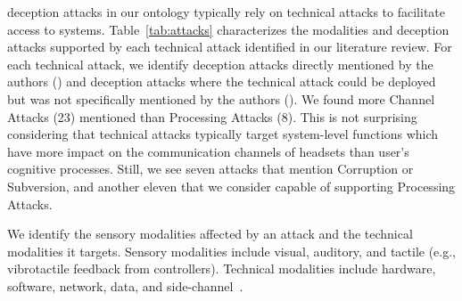 \MR deception attacks in our ontology typically rely on technical attacks to facilitate access to \MR systems.
Table~\ref{tab:attacks} characterizes the modalities and deception attacks supported by each technical attack identified in our literature review.
For each technical attack, we identify deception attacks directly mentioned by the authors () and deception attacks where the technical attack could be deployed but was not specifically mentioned by the authors ().
We found more Channel Attacks (23) mentioned than Processing Attacks (8). 
This is not surprising considering that technical attacks typically target system-level functions which have more impact on the communication channels of \MR headsets than user's cognitive processes.
Still, we see seven attacks that mention Corruption or Subversion, and another eleven that we consider capable of supporting Processing Attacks.



We identify the sensory modalities affected by an attack and the technical modalities it targets. 
Sensory modalities include visual, auditory, and tactile (e.g., vibrotactile feedback from controllers).
Technical modalities include hardware, software, network, data, and side-channel~\cite{attkan2022cyber}.

